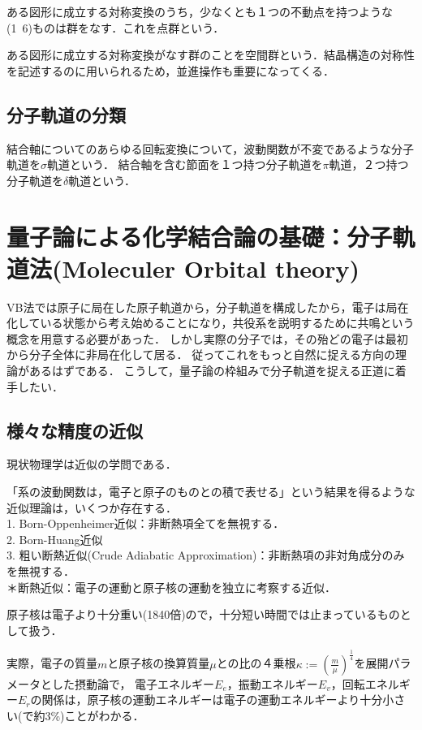 \documentclass[uplatex, dvipdfmx]{jsreport}
\begin{document}
\begin{definition}
    ある図形に成立する対称変換のうち，少なくとも１つの不動点を持つような(1~6)ものは群をなす．これを点群という．
\end{definition}
\begin{definition}
    ある図形に成立する対称変換がなす群のことを空間群という．結晶構造の対称性を記述するのに用いられるため，並進操作も重要になってくる．
\end{definition}

\subsection{分子軌道の分類}

結合軸についてのあらゆる回転変換について，波動関数が不変であるような分子軌道を$\sigma$軌道という．
結合軸を含む節面を１つ持つ分子軌道を$\pi$軌道，２つ持つ分子軌道を$\delta$軌道という．

\section{量子論による化学結合論の基礎：分子軌道法(Moleculer Orbital theory)}\label{section-mo}
VB法では原子に局在した原子軌道から，分子軌道を構成したから，電子は局在化している状態から考え始めることになり，共役系を説明するために共鳴という概念を用意する必要があった．
しかし実際の分子では，その殆どの電子は最初から分子全体に非局在化して居る．
従ってこれをもっと自然に捉える方向の理論があるはずである．
こうして，量子論の枠組みで分子軌道を捉える正道に着手したい．

\subsection{様々な精度の近似}
現状物理学は近似の学問である．

「系の波動関数は，電子と原子のものとの積で表せる」という結果を得るような近似理論は，いくつか存在する．\\
1. Born-Oppenheimer近似：非断熱項全てを無視する．\\
2. Born-Huang近似\\
3. 粗い断熱近似(Crude Adiabatic Approximation)：非断熱項の非対角成分のみを無視する．\\
＊断熱近似：電子の運動と原子核の運動を独立に考察する近似．

\begin{theory}
    原子核は電子より十分重い(1840倍)ので，十分短い時間では止まっているものとして扱う．
    
    実際，電子の質量$m$と原子核の換算質量$\mu$との比の４乗根$\kappa:=\left(\frac{m}{\mu}\right)^{\frac{1}{4}}$を展開パラメータとした摂動論で，
    電子エネルギー$E_e$，振動エネルギー$E_v$，回転エネルギー$E_r$の関係は，原子核の運動エネルギーは電子の運動エネルギーより十分小さい(で約3\%)ことがわかる．
\end{theory}
\end{document}
